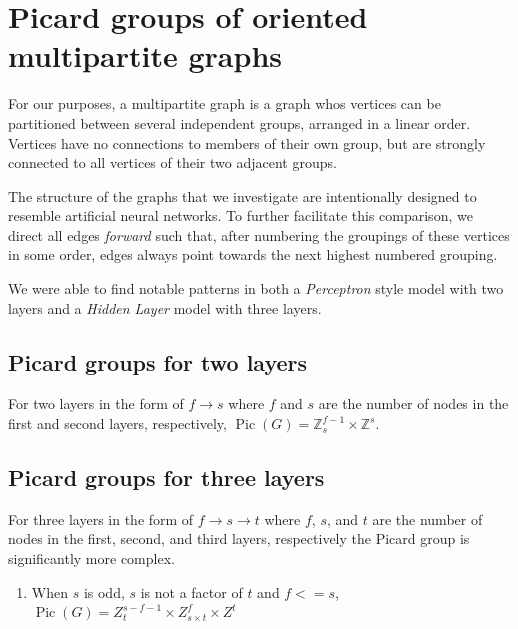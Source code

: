 \documentclass[11pt,reqno]{amsart}
\DeclareMathOperator{\Pic}{Pic}
\theoremstyle{definition}
\theoremstyle{plain}
\begin{document}
\section{Picard groups of oriented multipartite graphs}
	For our purposes, a multipartite graph is a graph whos vertices can be partitioned between several independent
	groups, arranged in a linear order.  Vertices have no connections to members of their own group, but are strongly
	connected to all vertices of their two adjacent groups.

	The structure of the graphs that we investigate are intentionally designed to resemble artificial neural networks.
	To further facilitate this comparison, we direct all edges \textit{forward} such that, after numbering the groupings
	of these vertices in some order, edges always point towards the next highest numbered grouping.

	We were able to find notable patterns in both a \textit{Perceptron} style model with two layers and a
	\textit{Hidden Layer} model with three layers.

	\subsection{Picard groups for two layers}
		For two layers in the form of $f \rightarrow s$ where $f$ and $s$ are the number of nodes in the first and
		second layers, respectively, $\Pic(G) = \mathbb{Z}_{s}^{f-1} \times \mathbb{Z}^s$.

	\subsection{Picard groups for three layers}
		For three layers in the form of $f \rightarrow s \rightarrow t$ where $f$, $s$, and $t$ are the number of nodes
		in the first, second, and third layers, respectively the Picard group is significantly more complex.

		\begin{enumerate}
			\item When $s$ is odd, $s$ is not a factor of $t$ and $f <= s$,
				$\Pic(G) = Z_{t}^{s-f-1} \times Z_{s \times t}^{f} \times Z^t$
		\end{enumerate}

%
\end{document}
